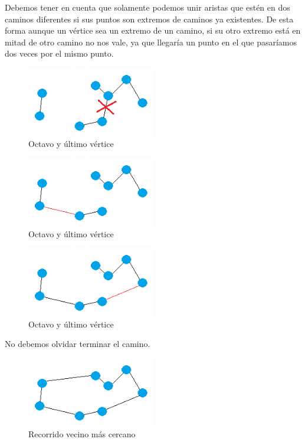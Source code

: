 \vspace{0.5cm}

Debemos tener en cuenta que solamente podemos unir aristas que estén en dos caminos diferentes si sus puntos son extremos de caminos ya existentes. De esta forma aunque un vértice sea un extremo de un camino, si su otro extremo está en mitad de otro camino no nos vale, ya que llegaría un punto en el que pasaríamos dos veces por el mismo punto.

\begin{figure}[htbH] 
	\centering
	\includegraphics[width=0.5\textwidth]{./Imagenes/arista6fail.png}
	\caption{Octavo y último vértice} 
\end{figure}

\vspace{0.5cm}
\begin{figure}[htbH] 
	\centering
	\includegraphics[width=0.5\textwidth]{./Imagenes/arista7.png}
	\caption{Octavo y último vértice} 
\end{figure}

\vspace{0.5cm}
\begin{figure}[htbH] 
	\centering
	\includegraphics[width=0.5\textwidth]{./Imagenes/arista8.png}
	\caption{Octavo y último vértice} 
\end{figure}

No debemos olvidar terminar el camino.

\begin{figure}[htbH] 
	\centering
	\includegraphics[width=0.5\textwidth]{./Imagenes/arista9.png}
	\caption{Recorrido vecino más cercano} 
\end{figure}

